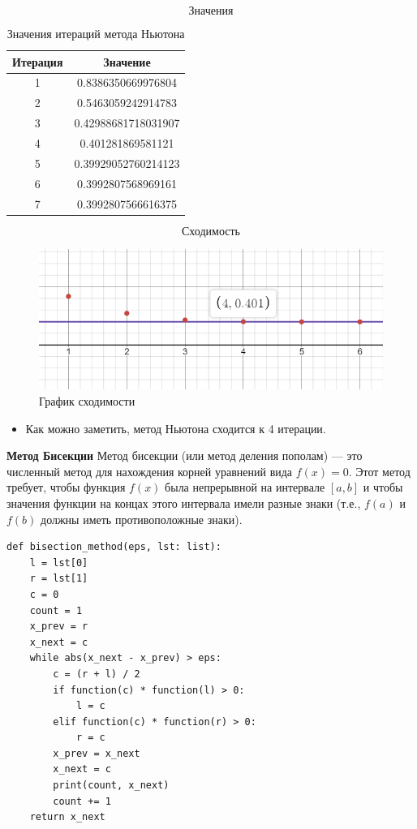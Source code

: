 \documentclass{article}
\begin{document}
$$\textbf{Значения}$$
\begin{table}[H]
\centering

\begin{tabular}{|c|c|}
\hline
Итерация & Значение \\
\hline
1 &  0.8386350669976804 \\
\hline
2 &  0.5463059242914783 \\
\hline
3 & 0.42988681718031907 \\
\hline
4 &  0.401281869581121  \\
\hline
5 & 0.39929052760214123 \\
\hline
6 &  0.3992807568969161 \\
\hline
7 &  0.3992807566616375 \\
\hline
\end{tabular}
\caption{Значения итераций метода Ньютона}
\end{table}
$$\textbf{Сходимость}$$
\begin{figure}[H]
    \centering
    \includegraphics[width=\textwidth]{lab_7_3.png}
    \caption{График сходимости}
    \label{fig:my_label}
\end{figure}
\begin{itemize}
    \item Как можно заметить, метод Ньютона сходится к 4 итерации.
\end{itemize}
\textbf{\large{Метод Бисекции}} 
Метод бисекции (или метод деления пополам) — это численный метод для нахождения корней уравнений вида \( f(x) = 0 \). Этот метод требует, чтобы функция \( f(x) \) была непрерывной на интервале \([a, b]\) и чтобы значения функции на концах этого интервала имели разные знаки (т.е., \( f(a) \) и \( f(b) \) должны иметь противоположные знаки).
\begin{lstlisting}
def bisection_method(eps, lst: list):
    l = lst[0]
    r = lst[1]
    c = 0
    count = 1
    x_prev = r
    x_next = c
    while abs(x_next - x_prev) > eps:
        c = (r + l) / 2
        if function(c) * function(l) > 0:
            l = c
        elif function(c) * function(r) > 0:
            r = c
        x_prev = x_next
        x_next = c
        print(count, x_next)
        count += 1
    return x_next

\end{lstlisting}
\end{document}
